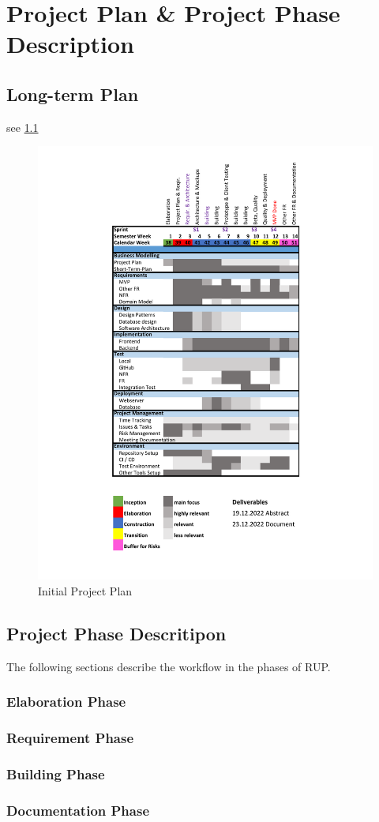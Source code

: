 \chapter{Project Plan \& Project Phase Description}

\section{Long-term Plan}

see \ref*{fig:projectPlan}

    \begin{figure}[h!]
        \centering
        \includegraphics[scale=0.85,center]{resources/ProjectPlan.pdf}
        \caption{Initial Project Plan}
        \label{fig:projectPlan}
    \end{figure}

\section{Project Phase Descritipon}
The following sections describe the workflow in the phases of RUP.
\subsection{Elaboration Phase}

\subsection{Requirement Phase}

\subsection{Building Phase}

\subsection{Documentation Phase}

